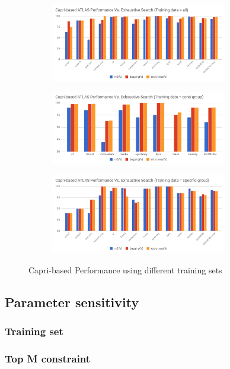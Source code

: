   \begin{figure}[tbhp]
    \centering
    \begin{subfigure}[b]{1.0\linewidth}
      \centering
      \includegraphics[width=0.85\textwidth]{images/all_perf.png}
      \caption{ }
      \label{fig:all_perf}
    \end{subfigure}
    \begin{subfigure}[b]{1.0\linewidth}
      \centering
      \includegraphics[width=0.85\textwidth]{images/corei_perf.png}
      \caption{ }
      \label{fig:corei_perf}
    \end{subfigure}
    \begin{subfigure}[b]{1.0\linewidth}
      \centering
      \includegraphics[width=0.85\textwidth]{images/specific_perf.png}
      \caption{ }
      \label{fig:specific_perf}
    \end{subfigure}
  \caption{Capri-based \atl Performance using different training sets}
  \end{figure}

  \subsection{Parameter sensitivity}
  \label{sec:parametersensitivity}

    \subsubsection{Training set}
    \label{sec:training_set}

    \subsubsection{Top M constraint}
    \label{sec:top_m}
